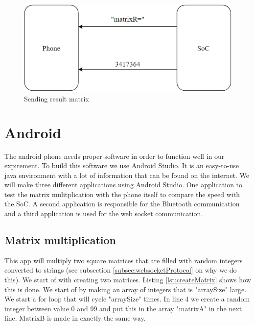 \documentclass[a4paper, 11pt]{report}
\begin{document}
\begin{figure}[ht]
\centering
\includegraphics[scale=0.7]{images/webSocketCom2.pdf}
\caption{Sending result matrix}\label{fig:ResultMatrix}
\end{figure}

\section{Android}
The android phone needs proper software in order to function well in our expirement. To build this software we use Android Studio. It is an easy-to-use java environment with a lot of information that can be found on the internet. We will make three different applications using Android Studio. One application to test the matrix mulitplication with the phone itself to compare the speed with the SoC. A second application is responsible for the Bluetooth communication and a third application is used for the web socket communication.

	\subsection{Matrix multiplication}
This app will multiply two square matrices that are filled with random integers converted to strings (see subsection \ref{subsec:websocketProtocol} on why we do this). We start of with creating two matrices. Listing \ref{lst:createMatrix} shows how this is done. We start of by making an array of integers that is "arraySize" large. We start a for loop that will cycle "arraySize" times. In line 4 we create a random integer between value 0 and 99 and put this in the array "matrixA" in the next line. MatrixB is made in exactly the same way.
\end{document}
